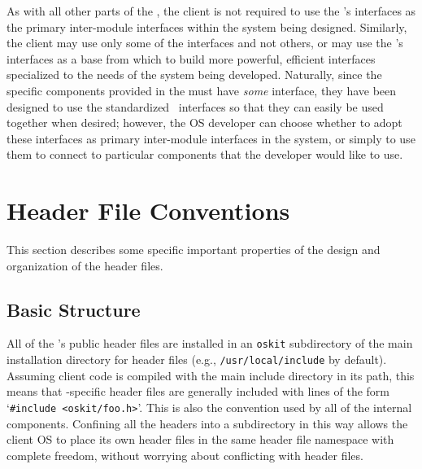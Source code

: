 As with all other parts of the \oskit,
the client is not required to use the \oskit's interfaces
as the primary inter-module interfaces
within the system being designed.
Similarly,
the client may use only some of the interfaces and not others,
or may use the \oskit's interfaces as a base
from which to build more powerful, efficient interfaces
specialized to the needs of the system being developed.
Naturally, since the specific components provided in the \oskit{}
must have \emph{some} interface,
they have been designed to use the standardized \oskit\ interfaces
so that they can easily be used together when desired;
however, the OS developer can choose
whether to adopt these interfaces
as primary inter-module interfaces in the system,
or simply to use them to connect to particular \oskit{} components
that the developer would like to use.


\section{Header File Conventions}

This section describes some specific important properties
of the design and organization of the \oskit{} header files.

\subsection{Basic Structure}

All of the \oskit's public header files
are installed in an \texttt{oskit} subdirectory
of the main installation directory for header files
(e.g., \texttt{/usr/local/include} by default).
Assuming client code is compiled
with the main include directory in its path,
this means that \oskit-specific header files are generally included
with lines of the form `{\tt \#include <oskit/foo.h>}'.
This is also the convention used
by all of the internal \oskit{} components.
Confining all the \oskit{} headers into a subdirectory in this way
allows the client OS to place its own header files
in the same header file namespace with complete freedom,
without worrying about conflicting with \oskit{} header files.


